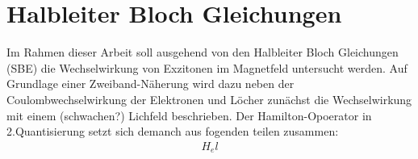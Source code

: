 \documentclass[a4paper,12pt]{article}
\begin{document}
\section{Halbleiter Bloch Gleichungen}
Im Rahmen dieser Arbeit soll ausgehend von den Halbleiter Bloch Gleichungen (SBE) die Wechselwirkung von Exzitonen im Magnetfeld untersucht werden. Auf Grundlage einer Zweiband-Näherung wird dazu neben der Coulombwechselwirkung der Elektronen und Löcher zunächst die Wechselwirkung mit einem (schwachen?) Lichfeld beschrieben. Der Hamilton-Opoerator in 2.Quantisierung setzt sich demanch aus fogenden teilen zusammen: 
\begin{align*}
H_el
\end{align*}
\end{document}

